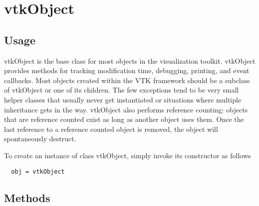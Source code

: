 \section{vtkObject}

\subsection{Usage}

 vtkObject is the base class for most objects in the visualization
 toolkit. vtkObject provides methods for tracking modification time,
 debugging, printing, and event callbacks. Most objects created
 within the VTK framework should be a subclass of vtkObject or one
 of its children.  The few exceptions tend to be very small helper
 classes that usually never get instantiated or situations where
 multiple inheritance gets in the way.  vtkObject also performs
 reference counting: objects that are reference counted exist as
 long as another object uses them. Once the last reference to a
 reference counted object is removed, the object will spontaneously
 destruct.

To create an instance of class vtkObject, simply
invoke its constructor as follows
\begin{verbatim}
  obj = vtkObject
\end{verbatim}
\subsection{Methods}

